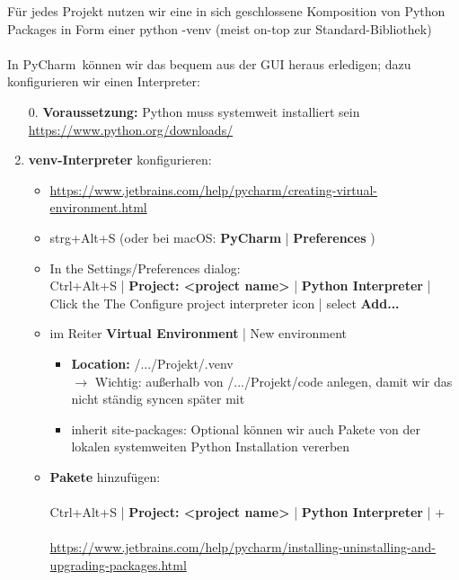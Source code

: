 	Für jedes Projekt nutzen wir eine in sich geschlossene Komposition von Python Packages in Form einer python -venv (meist on-top zur Standard-Bibliothek)  \\~\\
	In PyCharm~können wir das bequem aus der GUI heraus erledigen; dazu konfigurieren wir einen Interpreter:
	\begin{enumerate}
		\item[0.] \textbf{Voraussetzung:} Python muss systemweit installiert sein \url{https://www.python.org/downloads/}
		\item \textbf{venv-Interpreter} konfigurieren:
		\begin{itemize}
			\item \url{https://www.jetbrains.com/help/pycharm/creating-virtual-environment.html}
			\item strg+Alt+S (oder bei macOS:  \textbf{PyCharm} | \textbf{Preferences} )
			\item In the Settings/Preferences dialog:\\
			Ctrl+Alt+S | \textbf{Project: <project name>} | \textbf{Python Interpreter} |
			Click the The Configure project interpreter icon | select \textbf{Add...}
			\item im Reiter \textbf{Virtual Environment} | New environment
			\begin{itemize}
				\item \textbf{Location: }/.../Projekt/.venv\\
				$\to$ {\color{red}Wichtig:}  außerhalb von /.../Projekt/code anlegen, damit wir das nicht ständig syncen später mit \git
				\item inherit site-packages: Optional können wir auch Pakete von der lokalen systemweiten Python Installation vererben
			\end{itemize}
			\item  \textbf{Pakete} hinzufügen:\\~\\
			Ctrl+Alt+S | \textbf{Project: <project name>} | \textbf{Python Interpreter} | +\\~\\
			{\small \url{https://www.jetbrains.com/help/pycharm/installing-uninstalling-and-upgrading-packages.html}}
		\end{itemize}

\end{enumerate}
